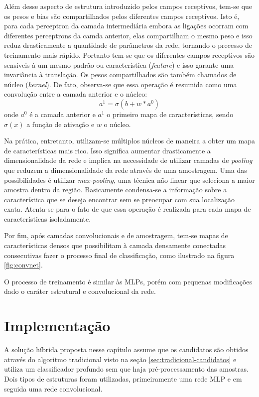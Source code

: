Além desse aspecto de estrutura introduzido pelos campos receptivos, tem-se que os pesos e bias são compartilhados pelos diferentes campos receptivos. Isto é, para cada perceptron da camada intermediária embora as ligações ocorram com diferentes perceptrons da camda anterior, elas compartilham o mesmo peso e isso reduz drasticamente a quantidade de parâmetros da rede, tornando o precesso de treinamento mais rápido. Portanto tem-se que os diferentes campos receptivos são sensíveis à um mesmo padrão ou característica (\textit{feature}) e isso garante uma invariância à translação. Os pesos compartilhados são também chamados de núcleo (\textit{kernel}). De fato, observa-se que essa operação é resumida como uma convolução entre a camada anterior e o núcleo:
\begin{equation}
a^1 = \sigma(b+ w \ast a^0) 
\end{equation}
onde $a^0$ é a camada anterior e $a^1$ o primeiro mapa de características, sendo $\sigma(x)$ a função de ativação e $w$ o núcleo.

Na prática, entretanto, utilizam-se múltiplos núcleos de maneira a obter um mapa de características mais rico. Isso significa aumentar drasticamente a dimensionalidade da rede e implica na necessidade de utilizar camadas de \textit{pooling} que reduzem a dimensionalidade da rede através de uma amostragem. Uma das possibilidades é utilizar \textit{max-pooling}, uma técnica não linear que seleciona a maior amostra dentro da região. Basicamente condensa-se a informação sobre a característica que se deseja encontrar sem se preocupar com sua localização exata. Atenta-se para o fato de que essa operação é realizada para cada mapa de características isoladamente.

Por fim, após camadas convolucionais e de amostragem, tem-se mapas de características densos que possibilitam à camada densamente conectadas consecutivas fazer o processo final de classificação, como ilustrado na figura \ref{fig:convnet}. 

O processo de treinamento é similar às MLPs, porém com pequenas modificações dado o caráter estrutural e convolucional da rede.

\section{Implementação}
A solução híbrida proposta nesse capítulo assume que os candidatos são obtidos através do algoritmo tradicional visto na seção \ref{sec:tradicional-candidatos} e utiliza um classificador profundo sem que haja pré-processamento das amostras. Dois tipos de estruturas foram utilizadas, primeiramente uma rede MLP e em seguida uma rede convolucional. 

